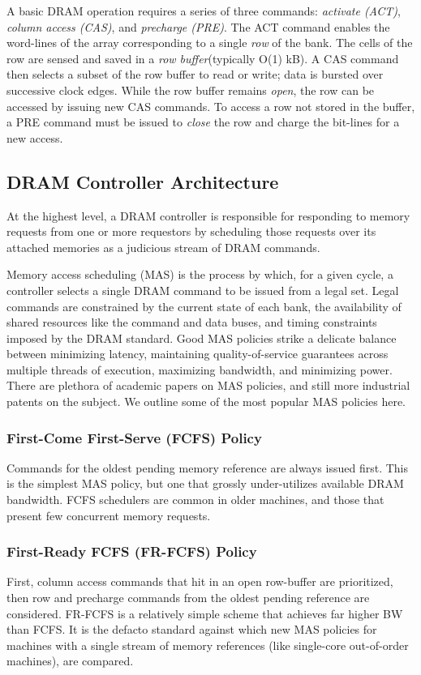 A basic DRAM operation requires a series of three commands: \emph{activate
(ACT)}, \emph{column access (CAS)}, and \emph{precharge (PRE)}. The ACT
command enables the word-lines of the array corresponding to a single
\emph{row} of the bank. The cells of the row are sensed and saved in a
\emph{row buffer}(typically O(1) kB). A CAS command then selects a subset of
the row buffer to read or write; data is bursted over successive clock edges.
While the row buffer remains \emph{open}, the row can be accessed by issuing
new CAS commands. To access a row not stored in the buffer, a PRE command must
be issued to \emph{close} the row and charge the bit-lines for a new access.

\subsection{DRAM Controller Architecture}

At the highest level, a DRAM controller is responsible for responding to memory
requests from one or more requestors by scheduling those requests over its
attached memories as a judicious stream of DRAM commands.

Memory access scheduling (MAS) is the process by which, for a given cycle, a
controller selects a single DRAM command to be issued from a legal set. Legal
commands are constrained by the current state of each bank, the availability
of shared resources like the command and data buses, and timing constraints
imposed by the DRAM standard. Good MAS policies strike a delicate balance
between minimizing latency, maintaining quality-of-service guarantees across
multiple threads of execution, maximizing bandwidth, and minimizing power.
There are plethora of academic papers on MAS policies, and still more
industrial patents on the subject. We outline some of the most popular MAS policies
here.

\subsubsection{First-Come First-Serve (FCFS) Policy}\label{fcfs}
Commands for the oldest pending memory reference are always issued first. This
is the simplest MAS policy, but one that grossly under-utilizes available DRAM
bandwidth. FCFS schedulers are common in older machines, and those that present
few concurrent memory requests.

\subsubsection{First-Ready FCFS (FR-FCFS)\cite{frfcfs} Policy}\label{frfcfs}
First, column access commands that hit in an open row-buffer are prioritized,
then row and precharge commands from the oldest pending reference are
considered.  FR-FCFS is a relatively simple scheme that achieves far higher BW
than FCFS. It is the defacto standard against which new MAS policies for
machines with a single stream of memory references (like single-core
out-of-order machines), are compared.

